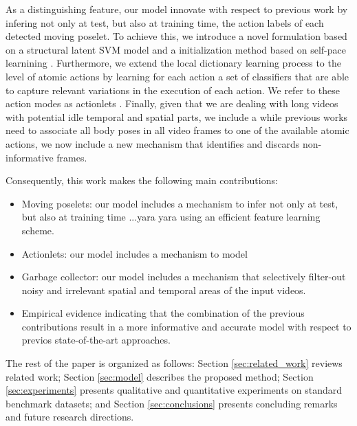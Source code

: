 As a distinguishing feature, our model innovate with respect to previous work by
infering not only at test, but also at training time, the action labels of each
detected moving poselet. To achieve this, we introduce a novel formulation based
on a structural latent SVM model \cite{} and a initialization method based on
self-pace learnining \cite{}. Furthermore, we extend the local dictionary
learning process to the level of atomic actions by learning for each action a
set of classifiers that are able to capture relevant variations in the execution
of each action. We refer to these action modes as actionlets \cite{}. Finally,
given that we are dealing with long videos with potential idle temporal and
spatial parts, we include a while previous works need to associate all body
poses in all video frames to one of the available atomic actions, we now include
a new mechanism that identifies and discards non-informative frames.

Consequently, this work makes the following main contributions:

\begin{itemize}

\item Moving poselets: our model includes a mechanism to infer not only at
test, but also at training time ...yara yara using an efficient feature
learning scheme.

\item Actionlets: our model includes a mechanism to model

\item Garbage collector: our model includes a mechanism that
selectively filter-out noisy and irrelevant spatial and temporal areas of the
input videos.

 \item Empirical evidence indicating that the combination of the previous
contributions result in a more informative and accurate model with
respect to previos state-of-the-art approaches.

\end{itemize}

The rest of the paper is organized as follows:
Section \ref{sec:related_work} reviews related work;
Section \ref{sec:model} describes the proposed method;
Section \ref{sec:experiments}  presents qualitative and quantitative experiments
on standard benchmark datasets;
and Section \ref{sec:conclusions} presents concluding remarks and future research
directions.

